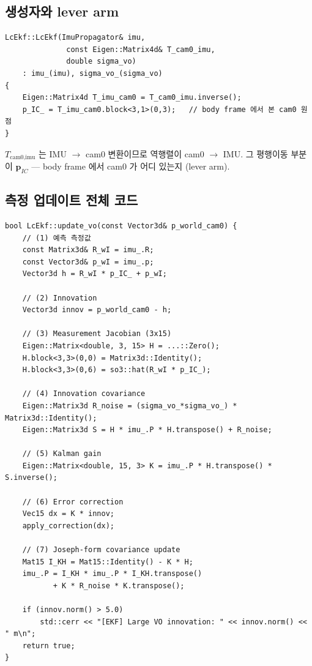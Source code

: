 \documentclass[11pt,a4paper,oneside]{report}
\begin{document}
\subsection{생성자와 lever arm}

\begin{lstlisting}[style=cpp,caption={\texttt{src/ekf/lc\_ekf.cpp:10-18}}]
LcEkf::LcEkf(ImuPropagator& imu,
              const Eigen::Matrix4d& T_cam0_imu,
              double sigma_vo)
    : imu_(imu), sigma_vo_(sigma_vo)
{
    Eigen::Matrix4d T_imu_cam0 = T_cam0_imu.inverse();
    p_IC_ = T_imu_cam0.block<3,1>(0,3);   // body frame 에서 본 cam0 원점
}
\end{lstlisting}

\(T_{\text{cam0,imu}}\) 는 IMU \(\to\) cam0 변환이므로 역행렬이 cam0 \(\to\) IMU. 그 평행이동 부분이 \(\bm{p}_{IC}\) — body frame 에서 cam0 가 어디 있는지 (lever arm).

\subsection{측정 업데이트 전체 코드}

\begin{lstlisting}[style=cpp,caption={\texttt{lc\_ekf.cpp:26-68}}]
bool LcEkf::update_vo(const Vector3d& p_world_cam0) {
    // (1) 예측 측정값
    const Matrix3d& R_wI = imu_.R;
    const Vector3d& p_wI = imu_.p;
    Vector3d h = R_wI * p_IC_ + p_wI;

    // (2) Innovation
    Vector3d innov = p_world_cam0 - h;

    // (3) Measurement Jacobian (3x15)
    Eigen::Matrix<double, 3, 15> H = ...::Zero();
    H.block<3,3>(0,0) = Matrix3d::Identity();
    H.block<3,3>(0,6) = so3::hat(R_wI * p_IC_);

    // (4) Innovation covariance
    Eigen::Matrix3d R_noise = (sigma_vo_*sigma_vo_) * Matrix3d::Identity();
    Eigen::Matrix3d S = H * imu_.P * H.transpose() + R_noise;

    // (5) Kalman gain
    Eigen::Matrix<double, 15, 3> K = imu_.P * H.transpose() * S.inverse();

    // (6) Error correction
    Vec15 dx = K * innov;
    apply_correction(dx);

    // (7) Joseph-form covariance update
    Mat15 I_KH = Mat15::Identity() - K * H;
    imu_.P = I_KH * imu_.P * I_KH.transpose()
           + K * R_noise * K.transpose();

    if (innov.norm() > 5.0)
        std::cerr << "[EKF] Large VO innovation: " << innov.norm() << " m\n";
    return true;
}
\end{lstlisting}
\end{document}
